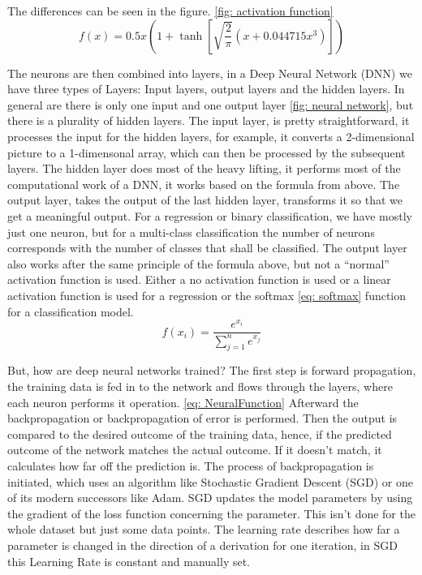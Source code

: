 The differences can be seen in the figure. \ref{fig: activation function}
\begin{equation}
    f(x) = 0.5x\left ( 1+\tanh\left [ \sqrt{\frac{2}{\pi}}\left ( x+0.044715x^3 \right ) \right ] \right )
    \label{eq: gelu}
\end{equation}

The neurons are then combined into layers, in a Deep Neural Network (DNN) we have three types of Layers:
Input layers, output layers and the hidden layers.
In general are there is only one input and one output layer \ref{fig: neural network}, but there is a plurality of hidden layers.
The input layer, is pretty straightforward, it processes the input for the hidden layers, for example, it converts a 2-dimensional picture to a 1-dimensonal array,
which can then be processed by the subsequent layers.
The hidden layer does most of the heavy lifting, it performs most of the computational work of a DNN, it works based on the formula from above.
The output layer, takes the output of the last hidden layer, transforms it so that we get a meaningful output.
For a regression or binary classification, we have mostly just one neuron, but for a multi-class classification the number of neurons corresponds with the number of classes that shall be classified.
The output layer also works after the same principle of the formula above, but not a “normal” activation function is used.
Either a no activation function is used or a linear activation function is used for a regression or the softmax \ref{eq: softmax} function for a classification model.
\begin{equation}
    f(x_i) = \frac{e^{x_i}}{\sum^n_{j=1}e^{x_j}}
    \label{eq: softmax}
\end{equation}

But, how are deep neural networks trained? \cite{lecun_deep_2015}
The first step is forward propagation, the training data is fed in to the network and flows through the layers, where each neuron performs it operation. \ref{eq: NeuralFunction}
Afterward the backpropagation or backpropagation of error is performed. \cite{rumelhart_learning_1986}
Then the output is compared to the desired outcome of the training data, hence, if the predicted outcome of the network matches the actual outcome.
If it doesn't match, it calculates how far off the prediction is.
The process of backpropagation is initiated, which uses an algorithm like Stochastic Gradient Descent (SGD) or one of its modern successors like Adam.
SGD updates the model parameters by using the gradient of the loss function concerning the parameter.
This isn't done for the whole dataset but just some data points.
The learning rate describes how far a parameter is changed in the direction of a derivation for one iteration, in SGD this Learning Rate is constant and manually set.


